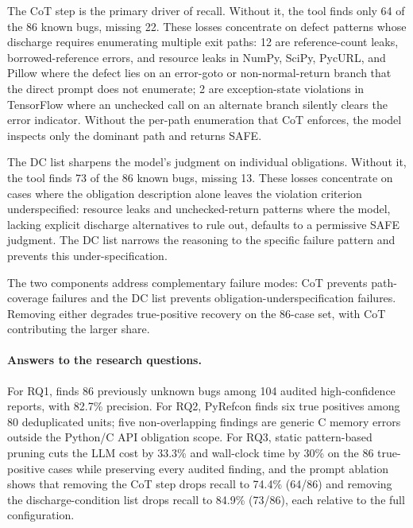 The CoT step is the primary driver of recall. Without it, the tool
finds only 64 of the 86 known bugs, missing 22. These losses
concentrate on defect patterns whose discharge requires enumerating
multiple exit paths: 12 are reference-count leaks, borrowed-reference
errors, and resource leaks in NumPy, SciPy, PycURL, and Pillow where
the defect lies on an error-goto or non-normal-return branch that the
direct prompt does not enumerate; 2 are exception-state violations in
TensorFlow where an unchecked call on an alternate branch silently
clears the error indicator. Without the per-path enumeration that CoT
enforces, the model inspects only the dominant path and returns SAFE.

The DC list sharpens the model's judgment on individual obligations.
Without it, the tool finds 73 of the 86 known bugs, missing 13. These
losses concentrate on cases where the obligation description alone
leaves the violation criterion underspecified: resource leaks and
unchecked-return patterns where the model, lacking explicit discharge
alternatives to rule out, defaults to a permissive SAFE judgment. The
DC list narrows the reasoning to the specific failure pattern and
prevents this under-specification.

The two components address complementary failure modes: CoT prevents
path-coverage failures and the DC list prevents
obligation-underspecification failures. Removing either degrades
true-positive recovery on the 86-case set, with CoT contributing the
larger share.


\paragraph{Answers to the research questions.}
For RQ1, \tool finds 86 previously unknown bugs among 104 audited
high-confidence reports, with 82.7\% precision. For RQ2, PyRefcon
finds six true positives among 80 deduplicated units; five
non-overlapping findings are generic C memory errors outside the
Python/C API obligation scope. For RQ3, static pattern-based pruning
cuts the LLM cost by 33.3\% and wall-clock time by 30\% on the 86
true-positive cases while preserving every audited finding, and the
prompt ablation shows that removing the CoT step drops recall to
74.4\% (64/86) and removing the discharge-condition list drops recall
to 84.9\% (73/86), each relative to the full configuration.
